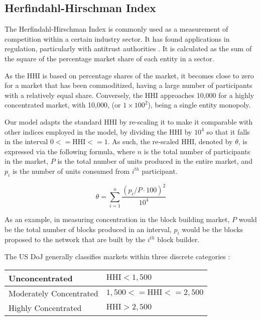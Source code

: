 \documentclass[conference]{IEEEtran}
\begin{document}
\subsection{Herfindahl-Hirschman Index}

The Herfindahl-Hirschman Index is commonly used as a measurement of competition within a certain industry sector. It has found applications in regulation, particularly with antitrust authorities \cite{usdoj2015}. It is calculated as the sum of the square of the percentage market share of each entity in a sector.

As the HHI is based on percentage shares of the market, it becomes close to zero for a market that has been commoditized, having a large number of participants with a relatively equal share.  Conversely, the HHI approaches 10,000 for a highly concentrated market, with 10,000, (or $1 \times 100^2 $), being a single entity monopoly.

Our model adapts the standard HHI by re-scaling it to make it comparable with other indices employed in the model, by dividing the HHI by $10^4$ so that it falls in the interval $0 <= \text{HHI} <= 1$. As such, the re-scaled HHI, denoted by $\theta$, is expressed via the following formula, where $n$ is the total number of participants in the market, $P$ is the total number of units produced in the entire market, and $p_i$ is the number of units consumed from $i^{th}$ participant.

\[\theta = \sum_{i=1}^{n} \frac{(p_{i}/P \cdot 100)^{2}}{10^{4}}
\]

As an example, in measuring concentration in the block building market, $P$ would be the total number of blocks produced in an interval,  $p_i$ would be the blocks proposed to the network that are built by the $i^{th}$ block builder.

The US DoJ generally classifies markets within three discrete categories \cite{usdoj2015}:

\vspace{8pt}

\begin{center}
\begin{tabular}{|l|l|}
\hline
Unconcentrated & $\text{HHI} < 1,500$  \\ \hline
Moderately Concentrated & $1,500 <= \text{HHI} <= 2,500$ \\ \hline
Highly Concentrated & $\text{HHI} > 2,500$ \\ \hline
\end{tabular}
\end{center}
\end{document}
